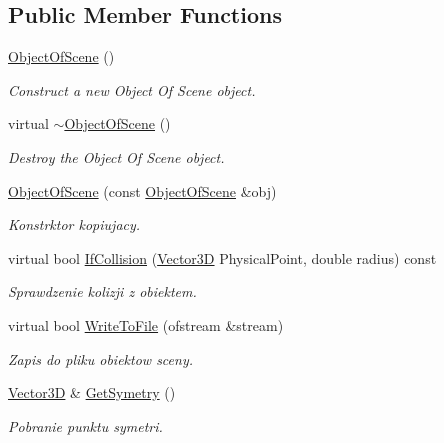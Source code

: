 \subsection*{Public Member Functions}
\begin{DoxyCompactItemize}
\item 
\hyperlink{class_object_of_scene_a248118c01bc3c0b3df93bcc8ff4c169d}{Object\+Of\+Scene} ()
\begin{DoxyCompactList}\small\item\em Construct a new Object Of Scene object. \end{DoxyCompactList}\item 
virtual \hyperlink{class_object_of_scene_a1f973b6e583fe163630538a9da7caad8}{$\sim$\+Object\+Of\+Scene} ()
\begin{DoxyCompactList}\small\item\em Destroy the Object Of Scene object. \end{DoxyCompactList}\item 
\hyperlink{class_object_of_scene_a9dae6b015fdf9354b8f49235d10c439e}{Object\+Of\+Scene} (const \hyperlink{class_object_of_scene}{Object\+Of\+Scene} \&obj)
\begin{DoxyCompactList}\small\item\em Konstrktor kopiujacy. \end{DoxyCompactList}\item 
virtual bool \hyperlink{class_object_of_scene_ab58c09e26c9c6016fe86dcbd1b76df00}{If\+Collision} (\hyperlink{vector3_d_8hh_a8790ef07836c1639da216f46501979c0}{Vector3D} Physical\+Point, double radius) const 
\begin{DoxyCompactList}\small\item\em Sprawdzenie kolizji z obiektem. \end{DoxyCompactList}\item 
virtual bool \hyperlink{class_object_of_scene_a79bbabdf7e17459475bf30856cf176aa}{Write\+To\+File} (ofstream \&stream)
\begin{DoxyCompactList}\small\item\em Zapis do pliku obiektow sceny. \end{DoxyCompactList}\item 
\hyperlink{vector3_d_8hh_a8790ef07836c1639da216f46501979c0}{Vector3D} \& \hyperlink{class_object_of_scene_a1a2714bc1777bd167536f760fcd6c417}{Get\+Symetry} ()
\begin{DoxyCompactList}\small\item\em Pobranie punktu symetri. \end{DoxyCompactList}\end{DoxyCompactItemize}
